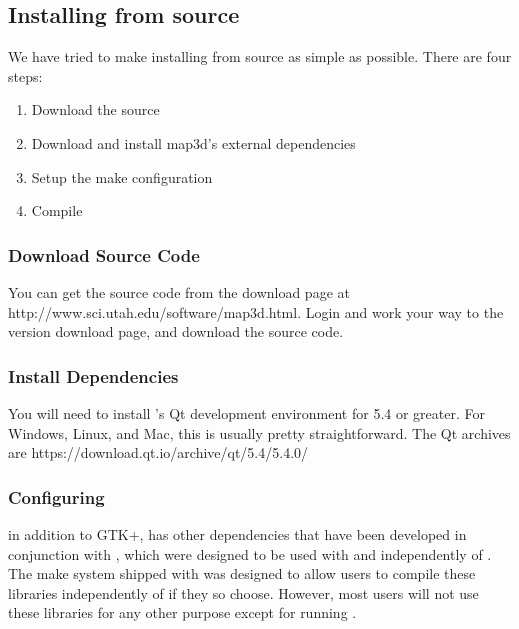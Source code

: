 \subsection{Installing from source}
\label{sec:source-install}

We have tried to make installing \map{} from source as simple as possible.  
There are four steps:


\begin{enumerate}
  \item Download the source
  \item Download and install map3d's external dependencies
  \item Setup the make configuration
  \item Compile
\end{enumerate}

\subsubsection{Download Source Code}
You can get the \map{} source code from the \map{} download page at 
{http://www.sci.utah.edu/software/map3d.html}.  Login and work your way
to the \map{} version \version{} download page, and download 
the source code.

\subsubsection{Install Dependencies}
You will need to install \map{}'s Qt development environment for 5.4 or greater.
For Windows, Linux, and Mac, this is usually pretty straightforward.  The Qt archives
are  {https://download.qt.io/archive/qt/5.4/5.4.0/}

\subsubsection{Configuring \map{}}
\map{} in addition to GTK+, \map{} has other dependencies that have been
developed in conjunction with \map{}, which were designed to be used 
with and independently of \map{}.  The make system shipped with \map{}
was designed to allow users to compile these libraries independently
of \map{} if they so choose.  However, most users will not use
these libraries for any other purpose except for running \map{}.

